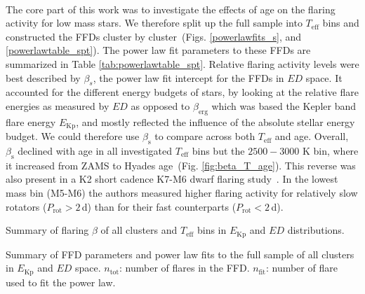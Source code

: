 \documentclass{aa}
\begin{document}
\\
The core part of this work was to investigate the effects of age on the flaring activity for low mass stars. We therefore split up the full sample into $T_\mathrm{eff}$ bins and constructed the FFDs cluster by cluster~(Figs. \ref{powerlawfits_s}, and \ref{powerlawtable_spt}). The power law fit parameters to these FFDs are summarized in Table \ref{tab:powerlawtable_spt}. Relative flaring activity levels were best described by $\beta_s$, the power law fit intercept for the FFDs in $ED$ space. It accounted for the different energy budgets of stars, by looking at the relative flare energies as measured by $ED$ as opposed to $\beta_\mathrm{erg}$ which was based the Kepler band flare energy $E_\mathrm{Kp}$, and mostly reflected the influence of the absolute stellar energy budget. We could therefore use $\beta_\mathrm{s}$ to compare across both $T_\mathrm{eff}$ and age. Overall, $\beta_\mathrm{s}$ declined with age in all investigated $T_\mathrm{eff}$ bins but the $2500-3000$ K bin, where it increased from ZAMS to Hyades age~(Fig. \ref{fig:beta_T_age}). This reverse was also present in a K2 short cadence K7-M6 dwarf flaring study~\citep{raetz2020}. In the lowest mass bin (M5-M6) the authors measured higher flaring activity for relatively slow rotators ($P_\mathrm{rot} > 2\,$d) than for their fast counterparts ($P_\mathrm{rot} < 2\,$d). 


\begin{table}
\caption{Summary of flaring $\beta$ of all clusters and $T_\mathrm{eff}$ bins in $E_\mathrm{Kp}$ and $ED$ distributions.}\label{tab:powerlawtable_spt}
\centering

\end{table}

\begin{table}
\caption{Summary of FFD parameters and power law fits to the full sample of all clusters in $E_\mathrm{Kp}$ and $ED$ space. $n_\mathrm{tot}$: number of flares in the FFD. $n_\mathrm{fit}$: number of flare used to fit the power law.}\label{tab:powerlawtable_fullsample}
\centering

\end{table}
\end{document}
